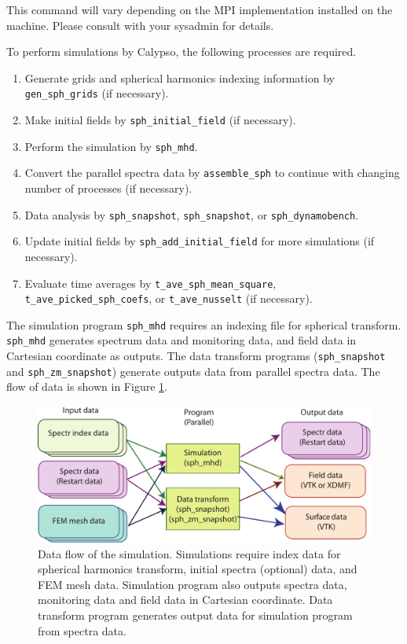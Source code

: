 This command will vary depending on the MPI implementation installed on the machine.  Please consult with your sysadmin for details.

%
To perform simulations by Calypso, the following processes are required.
%
\begin{enumerate}
\item Generate grids and spherical harmonics indexing information by \\
\verb|gen_sph_grids| (if necessary).
\item Make initial fields by \verb|sph_initial_field| (if necessary). 
\item Perform the simulation by \verb|sph_mhd|.
\item Convert the parallel spectra data by \verb|assemble_sph| to continue with changing number of processes (if necessary).
\item Data analysis by \verb|sph_snapshot|, \verb|sph_snapshot|, or \verb|sph_dynamobench|.
\item Update initial fields by \verb|sph_add_initial_field| for more simulations (if necessary).
\item Evaluate time averages by \verb|t_ave_sph_mean_square|, \verb|t_ave_picked_sph_coefs|, or \verb|t_ave_nusselt| (if necessary).
\end{enumerate}
%
The simulation program \verb|sph_mhd| requires an indexing file for spherical transform.  \verb|sph_mhd| generates spectrum data and monitoring data, and field data in Cartesian coordinate as outputs. The data transform programs (\verb|sph_snapshot| and \verb|sph_zm_snapshot|) generate outputs data  from parallel spectra data. The flow of data is shown in Figure \ref{fig:flow_0}. 
%
\begin{figure}[H]
\begin{center}
\includegraphics*[width=130mm]{Images/flow_0}
\end{center}
\caption{Data flow of the simulation. Simulations require index data for spherical harmonics transform, initial spectra (optional) data, and FEM mesh data. Simulation program also outputs spectra data, monitoring data and  field data in Cartesian coordinate. Data transform program generates output data for simulation program from spectra data.}
\label{fig:flow_0}
\end{figure}
%

